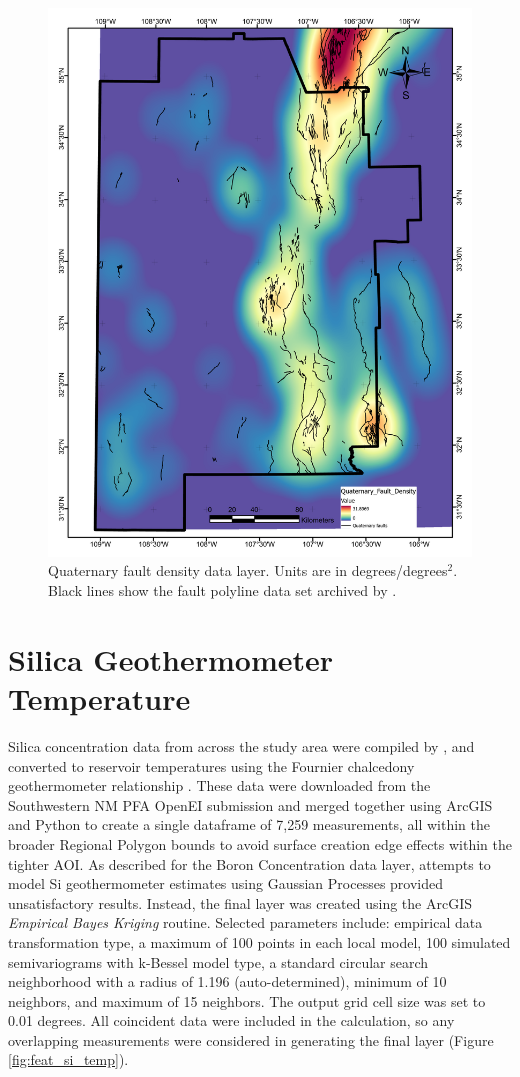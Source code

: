 \begin{figure}[H]
\centering
\includegraphics[width=0.75\linewidth]{templates/images/Figure-QFaultDensity.pdf}
\caption[Quaternary fault density data layer]{Quaternary fault density data layer. Units are in degrees/degrees$^2$. Black lines show the fault polyline data set archived by \protect\citet{bielicki_hydrogeolgic_2015}.}
\label{fig:feat_qfaults}
\end{figure}
\pagebreak

\section{Silica Geothermometer Temperature}\label{app:dl_geothermometer}
Silica concentration data from across the study area were compiled by \citet{bielicki_hydrogeolgic_2015}, and converted to reservoir temperatures using the Fournier chalcedony geothermometer relationship \citep{fournier_chemical_1977}. These data were downloaded from the Southwestern NM PFA OpenEI submission \citep{kelley_geothermal_2015} and merged together using ArcGIS and Python to create a single dataframe of 7,259 measurements, all within the broader Regional Polygon bounds to avoid surface creation edge effects within the tighter AOI. As described for the Boron Concentration data layer, attempts to model Si geothermometer estimates using Gaussian Processes provided unsatisfactory results. Instead, the final layer was created using the ArcGIS \textit{Empirical Bayes Kriging} routine. Selected parameters include: empirical data transformation type, a maximum of 100 points in each local model, 100 simulated semivariograms with k-Bessel model type, a standard circular search neighborhood with a radius of 1.196 (auto-determined), minimum of 10 neighbors, and maximum of 15 neighbors. The output grid cell size was set to 0.01 degrees. All coincident data were included in the calculation, so any overlapping measurements were considered in generating the final layer (Figure \ref{fig:feat_si_temp}).
\vfill
\pagebreak

